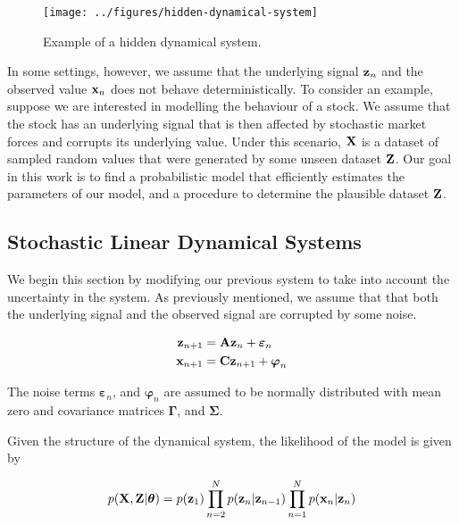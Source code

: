 \documentclass[11pt]{article}
\begin{document}
\begin{figure}[h!]
	\centering
	\texttt{[image: ../figures/hidden-dynamical-system]}
	\caption{Example of a hidden dynamical system.}
	\label{fig:hidden-dynamical-system}
\end{figure}

In some settings, however, we assume that the underlying signal ${\bf z}_n$ and the observed value ${\bf x}_n$ does not behave deterministically. To consider an example, suppose we are interested in modelling the behaviour of a stock. We assume that the stock has an underlying signal that is then affected by stochastic market forces and corrupts its underlying value. Under this scenario, ${\bf X}$ is a dataset of sampled random values that were generated by some unseen dataset ${\bf Z}$. Our goal in this work is to find a probabilistic model that efficiently estimates the parameters of our model, and a procedure to determine the plausible dataset $\bf Z$. 


\subsection{Stochastic Linear Dynamical Systems}
We begin this section by modifying our previous system to take into account the uncertainty in the system. As previously mentioned, we assume that that both the underlying signal and the observed signal are corrupted by some noise.
 

\begin{align*}
	{\bf z}_{n+1} &= {\bf A} {\bf z}_{n} + \boldsymbol\varepsilon_n\\
	{\bf x}_{n+1} &= {\bf C} {\bf z}_{n+1} + \boldsymbol\varphi_n
\end{align*}

The noise terms $\boldsymbol{\varepsilon}_n$, and $\boldsymbol{\varphi}_n$ are assumed to be normally distributed with mean zero and covariance matrices $\boldsymbol{\Gamma}$, and $\boldsymbol{\Sigma}$.

Given the structure of the dynamical system, the likelihood of the model is given by

\begin{equation}
	p({\bf X}, {\bf Z}\vert\boldsymbol\theta) = p({\bf z}_1)\prod_{n=2}^N p({\bf z}_n\vert {\bf z}_{n-1})\prod_{n=1}^N p({\bf x}_n\vert {\bf z}_n)
\end{equation}
\end{document}
